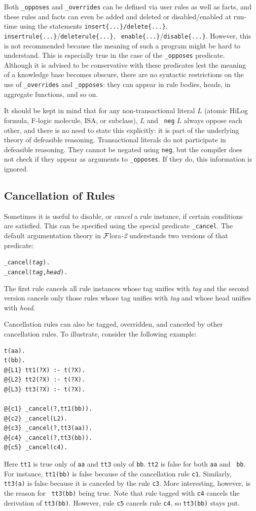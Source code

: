 \documentclass[11pt]{article}
\newcommand{\FLORA}{{\mbox{\sc ${\cal F}${lora}\rm\emph{-2}}}\xspace}
\begin{document}
Both {\tt \_opposes} and {\tt \_overrides} can be defined via user rules
as well as facts, and these rules and facts can even be added and deleted
or disabled/enabled
at run-time using the statements {\tt insert\{...\}/delete\{...\}}, {\tt
  insertrule\{...\}}/{\tt deleterule\{...\}}, {\tt
  enable\{...\}}/{\tt disable\{...\}}.
However, this is not recommended because the meaning of such a
program might be hard to understand. This is especially true in the case of
the {\tt \_opposes} predicate.  Although it is advised
to be conservative with these predicates lest the meaning of a knowledge
base becomes obscure, there are no syntactic restrictions on the use of
{\tt \_overrides} and {\tt \_opposes}: they can appear in rule bodies,
heads, in aggregate functions, and so on.  

It should be kept in mind that for any non-transactional literal $L$
(atomic HiLog formula, F-logic molecule, ISA, or subclass), $L$ and {\tt
  neg} $L$ always oppose each other, and there is no need to state this
explicitly: it is part of the underlying theory of defeasible reasoning.
Transactional literals do not participate in defeasible reasoning.
They cannot be negated using {\tt neg}, but the compiler does not check if
they appear as arguments to {\tt \_opposes}. If they do, this information
is ignored.

\subsection{Cancellation of Rules}\label{sec-cancel}

Sometimes it is useful to disable, or \emph{cancel} a rule instance, if
certain conditions are satisfied. This can be specified using the special
predicate {\tt \_cancel}. The default argumentation theory in \FLORA  
understands two versions of that predicate:
\begin{alltt}
    _cancel(\emph{tag}).
    _cancel(\emph{tag},\emph{head}).
\end{alltt}
The first rule cancels all rule instances whose tag unifies with
\emph{tag} and the second version cancels only those rules whose tag
unifies with \emph{tag} and whose head unifies with \emph{head}.   

Cancellation rules can also be tagged, overridden,
and canceled by other cancellation
rules. To illustrate,  consider the following example:
\begin{verbatim}
t(aa).
t(bb).
@{L1} tt1(?X) :- t(?X).
@{L2} tt2(?X) :- t(?X).
@{L3} tt3(?X) :- t(?X).

@{c1} _cancel(?,tt1(bb)).
@{c2} _cancel(L2).
@{c3} _cancel(?,tt3(aa)).
@{c4} _cancel(?,tt3(bb)).
@{c5} _cancel(c4).
\end{verbatim}
Here {\tt tt1} is true only of {\tt aa} and  
{\tt tt3} only of {\tt bb}. {\tt tt2} is false for both {\tt aa} and {\tt
  bb}. For instance, {\tt tt1(bb)} is false because of the cancellation
rule {\tt c1}. Similarly, {\tt tt3(a)} is false because it is canceled by
the rule {\tt c3}.   More interesting, however, is the reason for {\tt
  tt3(bb)} being true. Note that rule tagged with {\tt c4} cancels the
derivation of {\tt tt3(bb)}. However, rule {\tt c5} cancels rule {\tt c4},
so {\tt tt3(bb)} stays put.
\end{document}

